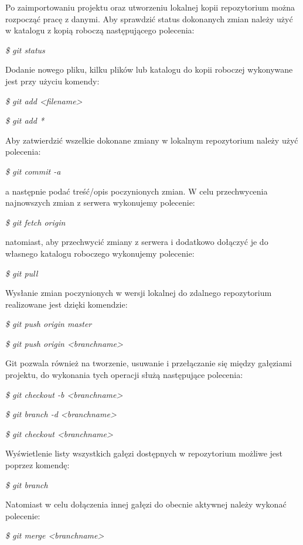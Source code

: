 Po zaimportowaniu projektu oraz utworzeniu lokalnej kopii repozytorium można rozpocząć pracę z danymi. Aby sprawdzić status dokonanych zmian należy użyć w katalogu z kopią roboczą następującego polecenia:
\begin{center}\textit{\$ git status}\end{center}
Dodanie nowego pliku, kilku plików lub katalogu do kopii roboczej wykonywane jest przy użyciu komendy:
\begin{center}\textit{\$ git add <filename>}\end{center}
\begin{center}\textit{\$ git add *}\end{center}
Aby zatwierdzić wszelkie dokonane zmiany w lokalnym repozytorium należy użyć polecenia:
\begin{center}\textit{\$ git commit -a}\end{center}
a następnie podać treść/opis poczynionych zmian.
W celu przechwycenia najnowszych zmian z serwera wykonujemy polecenie:
\begin{center}\textit{\$ git fetch origin}\end{center}
natomiast, aby przechwycić zmiany z serwera i dodatkowo dołączyć je do własnego katalogu roboczego wykonujemy polecenie: 
\begin{center}\textit{\$ git pull}\end{center}

Wysłanie zmian poczynionych w wersji lokalnej do zdalnego repozytorium realizowane jest dzięki komendzie:
\begin{center}\textit{\$ git push origin master}\end{center}
\begin{center}\textit{\$ git push origin <branchname>}\end{center}
Git pozwala również na tworzenie, usuwanie i przełączanie się między gałęziami projektu, do wykonania tych operacji służą następujące polecenia:
\begin{center}\textit{\$ git checkout -b <branchname>}\end{center}
\begin{center}\textit{\$ git branch -d <branchname>}\end{center}
\begin{center}\textit{\$ git checkout <branchname>}\end{center}
Wyświetlenie listy wszystkich gałęzi dostępnych w repozytorium możliwe jest poprzez komendę:
\begin{center}\textit{\$ git branch}\end{center}
Natomiast w celu dołączenia innej gałęzi do obecnie aktywnej należy wykonać polecenie:
\begin{center}\textit{\$ git merge <branchname>}\end{center}

